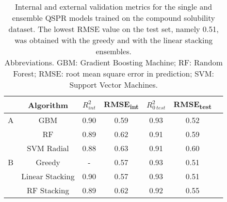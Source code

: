 \begin{table}[htb!]
\centering
\begin{tabular}[0.5width=\textwidth]{cccccc p{1cm}}
\hline
&   Algorithm & $R^{2}_{int}$   & RMSE\textsubscript{int} & $R^{2}_{0\ test}$ & RMSE\textsubscript{test}\\
\hline
A &   GBM         &   0.90 &    0.59 & 0.93 & 0.52\\
&   RF          &   0.89 &   0.62  & 0.91 & 0.59\\
  &    SVM Radial &   0.88 &   0.63  & 0.91 & 0.60\\
\hline
B &   Greedy      &   -  &  0.57    &  0.93    &   0.51\\
  &   Linear Stacking & 0.90 & 0.57 & 0.93 & 0.51\\
&   RF Stacking & 0.89 & 0.62 & 0.92 & 0.55\\
\hline
\end{tabular}
\caption{Internal and external validation metrics for the single and ensemble QSPR models trained on the compound solubility dataset.
The lowest RMSE value on the test set, namely 0.51, was obtained with the greedy and with
the linear stacking ensembles.\\
Abbreviations. GBM: Gradient Boosting Machine; RF: Random Forest; RMSE: root mean square error in prediction; SVM: Support Vector Machines.}
\label{}
\end{table}
